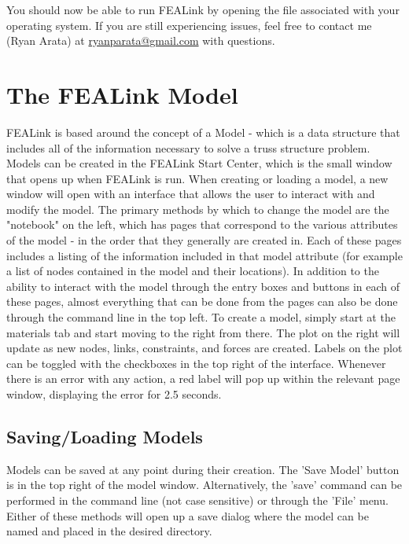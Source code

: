 \documentclass[11pt, oneside]{article}   	%
\begin{document}
You should now be able to run FEALink by opening the file associated with your operating system.  If you are still experiencing issues, feel free to contact me (Ryan Arata) at \href{mailto:ryanparata@gmail.com}{ryanparata@gmail.com} with questions.


\section{The FEALink Model}
FEALink is based around the concept of a Model - which is a data structure that includes all of the information necessary to solve a truss structure problem.  Models can be created in the FEALink Start Center, which is the small window that opens up when FEALink is run.  When creating or loading a model, a new window will open with an interface that allows the user to interact with and modify the model.  The primary methods by which to change the model are the "notebook" on the left, which has pages that correspond to the various attributes of the model - in the order that they generally are created in.  Each of these pages includes a listing of the information included in that model attribute (for example a list of nodes contained in the model and their locations).  In addition to the ability to interact with the model through the entry boxes and buttons in each of these pages, almost everything that can be done from the pages can also be done through the command line in the top left. To create a model, simply start at the materials tab and start moving to the right from there.  The plot on the right will update as new nodes, links, constraints, and forces are created.  Labels on the plot can be toggled with the checkboxes in the top right of the interface.  Whenever there is an error with any action, a red label will pop up within the relevant page window, displaying the error for 2.5 seconds.

\subsection{Saving/Loading Models}
Models can be saved at any point during their creation.  The 'Save Model' button is in the top right of the model window.  Alternatively, the 'save' command can be performed in the command line (not case sensitive) or through the 'File' menu.  Either of these methods will open up a save dialog where the model can be named and placed in the desired directory.  
\end{document}
